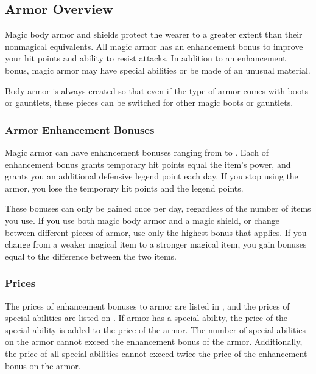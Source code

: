     \subsection{Armor Overview}

        Magic body armor and shields protect the wearer to a greater extent than their nonmagical equivalents.
        All magic armor has an enhancement bonus to improve your hit points and ability to resist attacks.
        In addition to an enhancement bonus, magic armor may have special abilities or be made of an unusual material.

        Body armor is always created so that even if the type of armor comes with boots or gauntlets, these pieces can be switched for other magic boots or gauntlets.

        \subsubsection{Armor Enhancement Bonuses}\label{Armor Enhancement Bonuses}

            Magic armor can have enhancement bonuses ranging from  to .
            Each  of enhancement bonus grants temporary hit points equal the item's power, and grants you an additional defensive legend point each day.
            If you stop using the armor, you lose the temporary hit points and the legend points.

            These bonuses can only be gained once per day, regardless of the number of items you use.
            If you use both magic body armor and a magic shield, or change between different pieces of armor, use only the highest bonus that applies.
            If you change from a weaker magical item to a stronger magical item, you gain bonuses equal to the difference between the two items.

        \subsubsection{Prices}\label{Armor Prices}
            The prices of enhancement bonuses to armor are listed in , and the prices of special abilities are listed on .
            If armor has a special ability, the price of the special ability is added to the price of the armor.
            The number of special abilities on the armor cannot exceed the enhancement bonus of the armor.
            Additionally, the price of all special abilities cannot exceed twice the price of the enhancement bonus on the armor.

